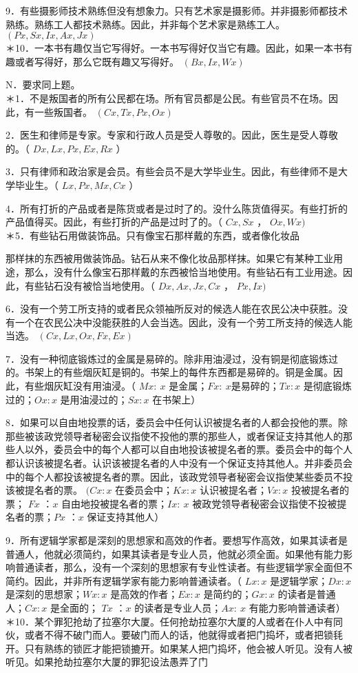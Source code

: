 9．有些摄影师技术熟练但没有想象力。只有艺术家是摄影师。并非摄影师都技术熟练。熟练工人都技术熟练。因此，并非每个艺术家是熟练工人。 $(P x, S x, I x, A x, J x)$\\
＊10．一本书有趣仅当它写得好。一本书写得好仅当它有趣。因此，如果一本书有趣或者写得好，那么它既有趣又写得好。 $(B x, I x, W x)$

N．要求同上题。\\
＊1．不是叛国者的所有公民都在场。所有官员都是公民。有些官员不在场。因此，有一些叛国者。 $(C x, T x, P x, O x)$

2．医生和律师是专家。专家和行政人员是受人尊敬的。因此，医生是受人尊敬的。（ $D x, L x, P x, E x, R x$ ）

3．只有律师和政治家是会员。有些会员不是大学毕业生。因此，有些律师不是大学毕业生。（ $L x, P x, M x, C x$ ）

4．所有打折的产品或者是陈货或者是过时了的。没什么陈货值得买。有些打折的产品值得买。因此，有些打折的产品是过时了的。（ $C x, S x$ ， $O x, W x)$\\
＊5．有些钻石用做装饰品。只有像宝石那样戴的东西，或者像化妆品

那样抹的东西被用做装饰品。钻石从来不像化妆品那样抹。如果它有某种工业用途，那么，没有什么像宝石那样戴的东西被恰当地使用。有些钻石有工业用途。因此，有些钻石没有被恰当地使用。（ $D x, A x, J x, C x$ ， $P x, I x)$

6．没有一个劳工所支持的或者民众领袖所反对的候选人能在农民公决中获胜。没有一个在农民公决中没能获胜的人会当选。因此，没有一个劳工所支持的候选人能当选。 $(C x, L x, O x, F x, E x)$

7．没有一种彻底锻炼过的金属是易碎的。除非用油浸过，没有铜是彻底锻炼过的。书架上的有些烟灰缸是铜的。书架上的每件东西都是易碎的。铜是金属。因此，有些烟灰缸没有用油浸。（ $M x: ~ x$ 是金属；$F x: ~ x$是易碎的；$T x: x$ 是彻底锻炼过的；$O x: x$ 是用油浸过的；$S x: x$ 在书架上）

8．如果可以自由地投票的话，委员会中任何认识被提名者的人都会投他的票。除那些被该政党领导者秘密会议指使不投他的票的那些人，或者保证支持其他人的那些人以外，委员会中的每个人都可以自由地投该被提名者的票。委员会中的每个人都认识该被提名者。认识该被提名者的人中没有一个保证支持其他人。并非委员会中的每个人都投该被提名者的票。因此，该政党领导者秘密会议指使某些委员不投该被提名者的票。 $(C x: x$ 在委员会中；$K x: x$ 认识被提名者；$V x: x$ 投被提名者的票； $F x$ ：$x$ 自由地投被提名者的票；$I x: ~ x$ 被政党领导者秘密会议指使不投被提名者的票；$P x$ ：$x$ 保证支持其他人）

9．所有逻辑学家都是深刻的思想家和高效的作者。要想写作高效，如果其读者是普通人，他就必须简约，如果其读者是专业人员，他就必须全面。如果他有能力影响普通读者，那么，没有一个深刻的思想家有专业性读者。有些逻辑学家全面但不简约。因此，并非所有逻辑学家有能力影响普通读者。（ $L x: x$ 是逻辑学家；$D x: x$ 是深刻的思想家；$W x: x$ 是高效的作者；$E x: x$ 是简约的；$G x: x$ 的读者是普通人；$C x: x$ 是全面的； $T x$ ：$x$ 的读者是专业人员；$A x: ~ x$ 有能力影响普通读者）\\
＊10．某个罪犯抢劫了拉塞尔大厦。任何抢劫拉塞尔大厦的人或者在仆人中有同伙，或者不得不破门而人。要破门而人的话，他就得或者把门捣坏，或者把锁㲎开。只有熟练的锁匠才能把锁摝开。如果某人把门捣坏，他会被人听见。没有人被听见。如果抢劫拉塞尔大厦的罪犯设法愚弄了门

